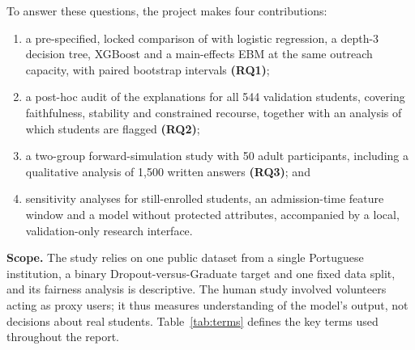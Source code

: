 \noindent To answer these questions, the project makes four contributions:
\begin{enumerate}[nosep,leftmargin=*]
  \item a pre-specified, locked comparison of \tabicl with logistic regression, a depth-3 decision
  tree, XGBoost and a main-effects EBM at the same outreach capacity, with paired bootstrap
  intervals \textbf{(RQ1)};
  \item a post-hoc audit of the explanations for all 544 validation students, covering
  faithfulness, stability and constrained recourse, together with an analysis of which students are
  flagged \textbf{(RQ2)};
  \item a two-group forward-simulation study with 50 adult participants, including a qualitative
  analysis of 1,500 written answers \textbf{(RQ3)}; and
  \item sensitivity analyses for still-enrolled students, an admission-time feature window and a
  model without protected attributes, accompanied by a local, validation-only research interface.
\end{enumerate}

\textbf{Scope.} The study relies on one public dataset from a single Portuguese institution, a
binary Dropout-versus-Graduate target and one fixed data split, and its fairness analysis is
descriptive. The human study involved volunteers acting as proxy users; it thus measures
understanding of the model's output, not decisions about real students. Table~\ref{tab:terms}
defines the key terms used throughout the report.


